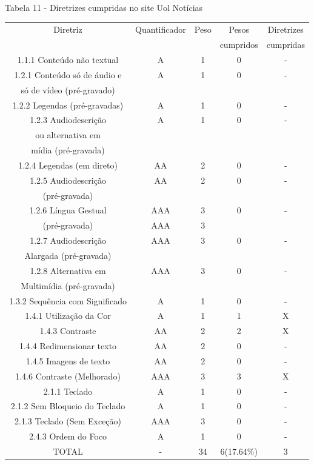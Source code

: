 \documentclass[a4paper]{article}
\begin{document}
\begin{titlepage}
Tabela 11 - Diretrizes cumpridas no site Uol Notícias\\[-1cm]
\begin{center}
	\fontsize{8pt}{8pt}\selectfont	
	\begin{longtable}{|c|c|c|c|c|}
		\hline
		Diretriz & Quantificador & Peso & Pesos & Diretrizes\\
		& & & cumpridos & cumpridas\\
		\hline
		1.1.1 Conteúdo não textual & A & 1 & 0 & - \\
		\hline
		1.2.1 Conteúdo só de áudio e & A & 1 & 0 & - \\
		só de vídeo (pré-gravado) & & & & \\
		\hline
		1.2.2 Legendas (pré-gravadas) & A & 1 & 0 & - \\
		\hline
		1.2.3 Audiodescrição & A & 1 & 0 & - \\
		ou alternativa em & & & & \\
		mídia (pré-gravada) & & & & \\
		\hline
		1.2.4 Legendas (em direto) & AA & 2 & 0 & - \\
		\hline
		1.2.5 Audiodescrição & AA & 2 & 0 & - \\
		(pré-gravada) & & & & \\
		\hline
		1.2.6 Língua Gestual & AAA & 3 & 0 & - \\
		(pré-gravada) & AAA & 3 & & \\
		\hline
		1.2.7 Audiodescrição & AAA & 3 & 0 & - \\
		Alargada (pré-gravada) & & & & \\
		\hline
		1.2.8 Alternativa em & AAA & 3 & 0 & - \\
		Multimídia (pré-gravada) & & & & \\
		\hline
		1.3.2 Sequência com Significado & A & 1 & 0 & - \\
		\hline
		1.4.1 Utilização da Cor & A & 1 & 1 & X \\
		\hline
		1.4.3 Contraste & AA & 2 & 2 & X \\
		\hline
		1.4.4 Redimensionar texto & AA & 2 & 0 & - \\
		\hline
		1.4.5 Imagens de texto & AA & 2 & 0 & - \\
		\hline
		1.4.6 Contraste (Melhorado) & AAA & 3 & 3 & X \\
		\hline
		2.1.1 Teclado & A & 1 & 0 & - \\
		\hline
		2.1.2 Sem Bloqueio do Teclado & A & 1 & 0 & - \\
		\hline
		2.1.3 Teclado (Sem Exceção) & AAA & 3 & 0 & - \\
		\hline
		2.4.3 Ordem do Foco & A & 1 & 0 & - \\
		\hline
		TOTAL & - & 34 & 6(17.64\%) & 3 \\
		\hline
	\end{longtable}
\end{center}


\end{titlepage}
\end{document}

